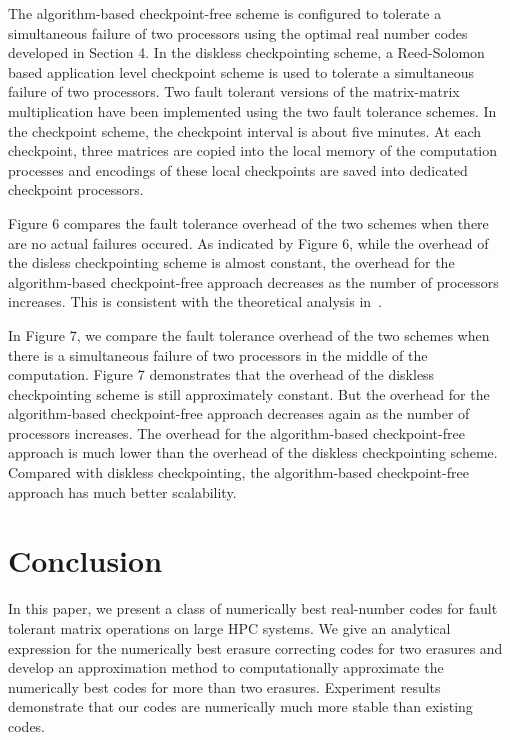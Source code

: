 \documentclass{sig-alternate}
\begin{document}
The algorithm-based checkpoint-free scheme is configured
to tolerate a simultaneous failure of two processors using the optimal real number codes developed 
in Section 4. In the diskless checkpointing scheme, a Reed-Solomon based application level checkpoint scheme is used to 
tolerate a simultaneous failure of two processors. Two fault tolerant versions of the matrix-matrix multiplication
have been implemented using the two fault tolerance schemes. In the checkpoint scheme, the checkpoint interval
is about five minutes. At each checkpoint, three matrices are copied into the local memory of the computation
processes and encodings of these local checkpoints are saved into dedicated checkpoint processors.

Figure 6 compares the fault tolerance overhead of the two schemes when there are no actual failures occured.
As indicated by Figure 6, while the overhead of the disless checkpointing scheme is almost constant,
the overhead for the algorithm-based checkpoint-free approach decreases as the number of processors increases.
This is consistent with the theoretical analysis in~\cite{chen:abft}.


In Figure 7,  we compare the fault tolerance overhead of the two schemes when there is 
a simultaneous failure of two processors in the middle of the computation.
Figure 7 demonstrates that the overhead of the diskless checkpointing scheme is still approximately constant.
But the overhead for the algorithm-based checkpoint-free approach decreases again as the number of processors increases.
The overhead for the algorithm-based checkpoint-free approach is much lower than the overhead of the 
diskless checkpointing scheme. Compared with diskless checkpointing,
the algorithm-based checkpoint-free approach has much better scalability.


\section{Conclusion}

In this paper, we present a class of numerically best real-number codes 
for fault tolerant matrix operations on large HPC systems. 
We give an analytical expression for the numerically best 
erasure correcting codes for two erasures and develop an approximation method to 
computationally approximate the numerically best codes for more than two erasures.
Experiment results demonstrate that our codes are numerically 
much more stable than existing codes. 
\end{document}
